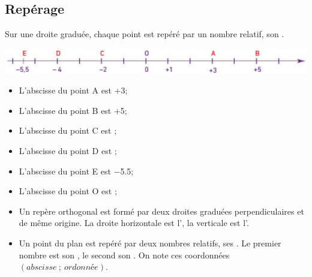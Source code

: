 \documentclass[xcolor={dvipsnames}]{beamer}
\begin{document}
\subsection{Repérage}
\begin{frame}
	\begin{mydef}
		
			Sur une droite graduée, \pause chaque point est repéré par un nombre relatif, \pause son .
	\end{mydef}

	\begin{myex}
		\begin{center}
			\includegraphics[scale=0.35]{droite2}		
		\end{center}
		
		
			\begin{itemize}
					\item L'abscisse du point A est \pause +3; \pause 
					\item L'abscisse du point B est \pause +5; \pause
					\item L'abscisse du point C est ; \pause
					\item L'abscisse du point D est ; \pause
					\item L'abscisse du point E est \pause \num{-5.5}; \pause
					\item L'abscisse du point O est \pause 0;
				
			\end{itemize}
		
	\end{myex}
\end{frame}

\begin{frame}
	\begin{mydefs}
		\begin{itemize}
				\item Un repère orthogonal est formé par \pause deux droites graduées perpendiculaires \pause et de même origine. La droite \pause  horizontale est l', \pause la verticale est l'.\pause 
				
				\item Un point du plan est repéré par deux nombres relatifs, \pause ses . \pause  Le premier nombre est son  \pause , le second son . On \pause note ces coordonnées $(abscisse \: ; \: ordonnée)$.
			
		\end{itemize}
	\end{mydefs}
\end{frame}
\end{document}
